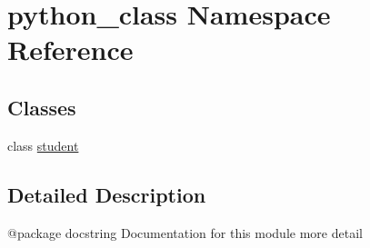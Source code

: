 \hypertarget{namespacepython__class}{\section{python\-\_\-class Namespace Reference}
\label{namespacepython__class}
}
\subsection*{Classes}
\begin{DoxyCompactItemize}
\item 
class \hyperlink{classpython__class_1_1student}{student}
\end{DoxyCompactItemize}


\subsection{Detailed Description}
\begin{DoxyVerb}@package docstring
  Documentation for this module
  more detail \end{DoxyVerb}
 